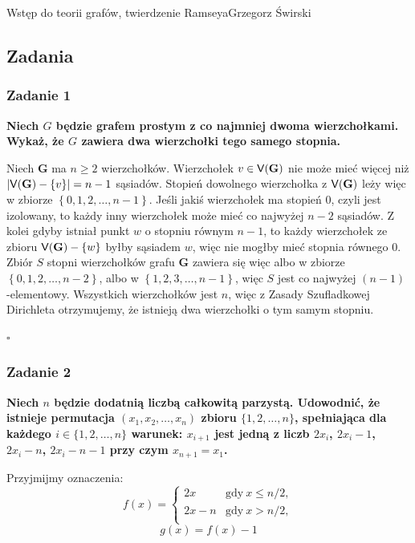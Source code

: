 \begin{referat}{Wstęp do teorii grafów, twierdzenie Ramseya}{Grzegorz Świrski}
\subsection{Zadania}

\subsubsection{Zadanie 1}
\textbf{Niech $G$ będzie grafem prostym z co najmniej dwoma wierzchołkami. Wykaż, że  $G$ zawiera dwa wierzchołki tego samego stopnia.}

Niech $\mathbf{G}$ ma $n\geq 2$ wierzchołków. 
Wierzchołek $v\in{\sf V}\!\left(\mathbf{G}\right)$ 
nie może mieć więcej niż $\left\vert {\sf V}\!\left(\mathbf{G}\right)-\left\lbrace v \right\rbrace \right\vert=n-1$ sąsiadów. 
Stopień dowolnego wierzchołka z ${\sf V}\!\left(\mathbf{G}\right)$ 
leży więc w zbiorze $\left\lbrace 0,1,2,\ldots,n-1 \right\rbrace$. 
Jeśli jakiś wierzchołek ma stopień $0$, czyli jest izolowany, 
to każdy inny wierzchołek może mieć co najwyżej $n-2$ sąsiadów. 
Z kolei gdyby istniał punkt $w$  o stopniu równym $n-1$, 
to każdy wierzchołek ze zbioru ${\sf V}\!\left(\mathbf{G}\right)-\left\lbrace w \right\rbrace$ 
byłby sąsiadem $w$, więc nie mogłby mieć stopnia równego $0$. 
Zbiór $S$ stopni wierzchołków grafu $\mathbf{G}$ zawiera się więc albo w zbiorze 
$\left\lbrace 0,1,2,\ldots,n-2 \right\rbrace$, albo w  $\left\lbrace 1,2,3,\ldots,n-1 \right\rbrace$, 
więc $S$ jest co najwyżej $\left( n-1 \right)$ -elementowy. 
Wszystkich wierzchołków jest $n$, 
więc z Zasady Szufladkowej Dirichleta otrzymujemy, 
że istnieją dwa wierzchołki o tym samym stopniu.
\begin{flushright}
$\square$
\end{flushright}

\subsubsection{Zadanie 2}
\textbf{Niech $n$ będzie dodatnią liczbą całkowitą parzystą. Udowodnić, że istnieje permutacja $ (x_1,x_2, \ldots,x_n) $ zbioru $ \{1,2,\ldots,n\} $, spełniająca dla każdego $ i \in \{1,2,\ldots,n\} $ warunek:
$x_{i+1} $ jest jedną z liczb $ 2x_i $, $ 2x_i-1 $, $ 2x_i-n $, $ 2x_i-n-1$
przy czym $ x_{n+1} = x_1 $.}

Przyjmijmy oznaczenia: 
$$f(x)=
\left\{\begin{array}{ll}
2x&\textrm{gdy}\ x \leq n/2,\\
2x-n&\textrm{gdy}\ x>n/2,\\
\end{array}\right.$$
$$ g(x)= f(x)-1 $$


\end{referat}
